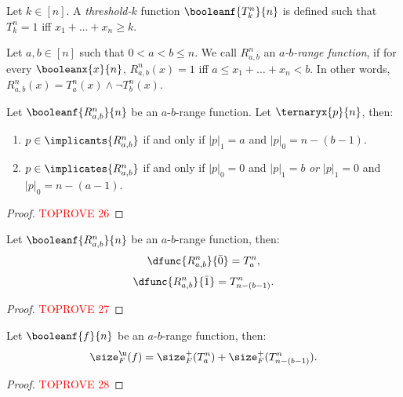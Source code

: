 \documentclass[acmsmall, nonacm, authorversion]{acmart}
\begin{document}
\begin{definition}\label{def:range-functions}
Let $k\in [n]$. A \emph{threshold-$k$} function $\booleanf{T_k^n}{n}$ is defined such that $T_k^n=1$ iff $x_1+\dots+x_n\ge k$.

Let $a,b\in [n]$ such that $0<a<b\le n$. We call $R_{a,b}^n$ an \emph{$a$-$b$-range function}, if for every $\booleanx{x}{n}$, $R_{a,b}^n(x)=1$ iff $a\leq x_1+\dots+x_n<b$. In other words, $R_{a,b}^n(x)=T^n_a(x) \land \neg T^n_b(x)$.
\end{definition}

\begin{lemma}\label{lem:prime-of-range-functions}
Let $\booleanf{R_{a,b}^n}{n}$ be an $a$-$b$-range function. Let $\ternaryx{p}{n}$, then:
\begin{enumerate}
    \item $p\in \implicants{R_{a,b}^n}$ if and only if $|p|_1=a$ and $|p|_0=n-(b-1)$. \label{item:prime-of-range-functions-1}
    \item $p\in \implicates{R_{a,b}^n}$ if and only if $|p|_0=0$ and $|p|_1=b$ \emph{or} $|p|_1=0$ and $|p|_0=n-(a-1)$. \label{item:prime-of-range-functions-2}
\end{enumerate}
\end{lemma}
\begin{proof}\textcolor{red}{TOPROVE 26}\end{proof}

\begin{lemma}\label{lem:derivatives-of-range-functions}
Let $\booleanf{R_{a,b}^n}{n}$ be an $a$-$b$-range function, then:
\[
\dfunc{R_{a,b}^n}{\bar{0}}=T_{a}^n,
\]
\[
\dfunc{R_{a,b}^n}{\bar{1}}=T_{n-(b-1)}^n.
\]
\end{lemma}
\begin{proof}\textcolor{red}{TOPROVE 27}\end{proof}

\begin{proposition}\label{prop:tight-lower-bound-range}
Let $\booleanf{f}{n}$ be an $a$-$b$-range function, then:
\[
\size_F^\u(f)=\size_F^+(T_a^n)+\size_F^+(T_{n-(b-1)}^n).
\]
\end{proposition}
\begin{proof}\textcolor{red}{TOPROVE 28}\end{proof}
\end{document}
